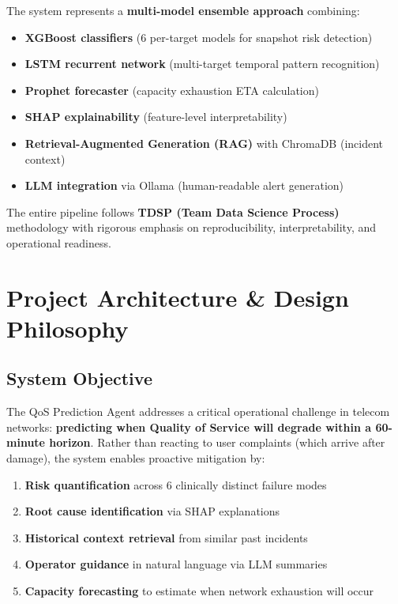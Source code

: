 \documentclass[11pt,a4paper,oneside]{report}
\begin{document}
The system represents a \textbf{multi-model ensemble approach} combining:
\begin{itemize}
    \item \textbf{XGBoost classifiers} (6 per-target models for snapshot risk detection)
    \item \textbf{LSTM recurrent network} (multi-target temporal pattern recognition)
    \item \textbf{Prophet forecaster} (capacity exhaustion ETA calculation)
    \item \textbf{SHAP explainability} (feature-level interpretability)
    \item \textbf{Retrieval-Augmented Generation (RAG)} with ChromaDB (incident context)
    \item \textbf{LLM integration} via Ollama (human-readable alert generation)
\end{itemize}

The entire pipeline follows \textbf{TDSP (Team Data Science Process)} methodology with rigorous emphasis on reproducibility, interpretability, and operational readiness.
\newpage
\chapter{Project Architecture \& Design Philosophy}

\section{System Objective}

The QoS Prediction Agent addresses a critical operational challenge in telecom networks: \textbf{predicting when Quality of Service will degrade within a 60-minute horizon}. Rather than reacting to user complaints (which arrive after damage), the system enables proactive mitigation by:

\begin{enumerate}
    \item \textbf{Risk quantification} across 6 clinically distinct failure modes
    \item \textbf{Root cause identification} via SHAP explanations
    \item \textbf{Historical context retrieval} from similar past incidents
    \item \textbf{Operator guidance} in natural language via LLM summaries
    \item \textbf{Capacity forecasting} to estimate when network exhaustion will occur
\end{enumerate}
\end{document}
